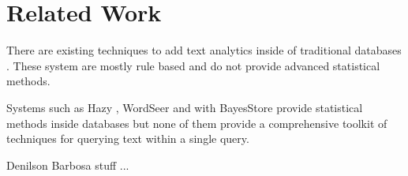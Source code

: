 
\section{Related Work}

There are existing techniques to add text analytics inside of 
traditional databases \cite{Jain:2009:BQO:1519103.1519108, Li:2011:SDI:2002440.2002459}.
These system are mostly rule based and do not provide advanced
statistical methods.

Systems such as Hazy \cite{Koc:2011:IMC:1952376.1952380}, 
WordSeer \cite{muralidharanvisual} and with BayesStore \cite{Wang:2008:BML:1453856.1453896} provide statistical 
methods inside databases but none of them provide a 
comprehensive toolkit of techniques for querying text within a single query.

Denilson Barbosa stuff ...

